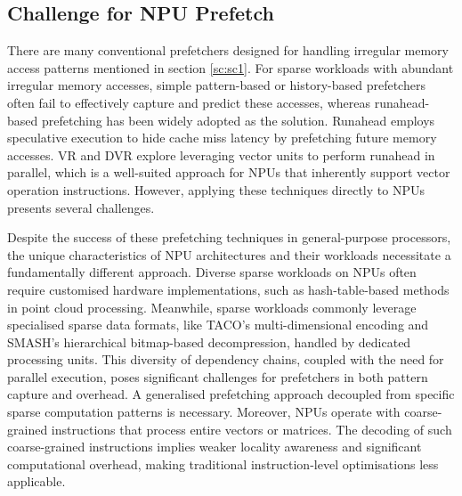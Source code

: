 \subsection{Challenge for NPU Prefetch}
\vspace{-3pt}
There are many conventional prefetchers designed for handling irregular memory access patterns mentioned in section \ref{sc:sc1}.
For sparse workloads with abundant irregular memory accesses, simple pattern-based\cite{pattern-based, Feedback-Directed}
or history-based\cite{history, SMS, VLDP} prefetchers often fail to effectively capture and predict these accesses, whereas runahead-based\cite{8runahead, 8CRE, 8PRE} prefetching has been widely adopted as the solution.
Runahead employs speculative execution to hide cache miss latency by prefetching future memory accesses.
VR\cite{8DVR} and DVR\cite{8VR} explore leveraging vector units to perform runahead in parallel, which is a well-suited approach for NPUs that inherently support vector operation instructions.
However, applying these techniques directly to NPUs presents several challenges.

Despite the success of these prefetching techniques in general-purpose processors, the unique characteristics of NPU architectures and their workloads necessitate a fundamentally different approach.
Diverse sparse workloads on NPUs often require customised hardware implementations, such as hash-table-based methods in point cloud processing.
Meanwhile, sparse workloads commonly leverage specialised sparse data formats, like TACO's \cite{parker:2016:meng-thesis} multi-dimensional encoding and SMASH's \cite{kanellopoulos2019smash} hierarchical bitmap-based decompression, handled by dedicated processing units.
This diversity of dependency chains, coupled with the need for parallel execution, poses significant challenges for prefetchers in both pattern capture and overhead. 
A generalised prefetching approach decoupled from specific sparse computation patterns is necessary.
Moreover, NPUs operate with coarse-grained instructions that process entire vectors or matrices. The decoding of such coarse-grained instructions implies weaker locality awareness and significant computational overhead, making traditional instruction-level optimisations less applicable.

